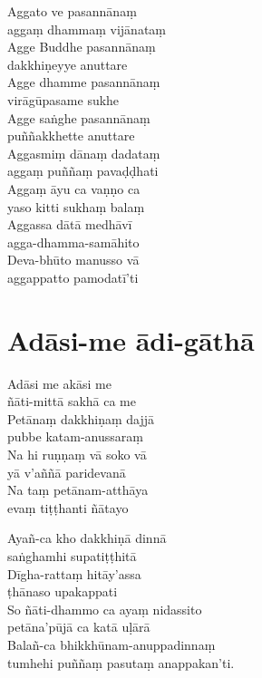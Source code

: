 
\begin{paritta}
  Aggato ve pasannānaṃ\\\vin aggaṃ dhammaṃ vijānataṃ\\
  Agge Buddhe pasannānaṃ\\\vin dakkhiṇeyye anuttare\\
  Agge dhamme pasannānaṃ\\\vin virāgūpasame sukhe\\
  Agge saṅghe pasannānaṃ\\\vin puññakkhette anuttare\\
  Aggasmiṃ dānaṃ dadataṃ\\\vin aggaṃ puññaṃ pavaḍḍhati\\
  Aggaṃ āyu ca vaṇṇo ca\\\vin yaso kitti sukhaṃ balaṃ\\
  Aggassa dātā medhāvī\\\vin agga-dhamma-samāhito\\
  Deva-bhūto manusso vā\\\vin aggappatto pamodatī'ti 
\end{paritta}

\section{Adāsi-me ādi-gāthā}



\enlargethispage{\baselineskip}

\begin{paritta}
Adāsi me akāsi me\\\vin ñāti-mittā sakhā ca me\\
Petānaṃ dakkhiṇaṃ dajjā\\\vin pubbe katam-anussaraṃ\\
Na hi ruṇṇaṃ vā soko vā\\\vin yā v'aññā paridevanā\\
Na taṃ petānam-atthāya\\\vin evaṃ tiṭṭhanti ñātayo


Ayañ-ca kho dakkhiṇā dinnā\\\vin saṅghamhi supatiṭṭhitā\\
Dīgha-rattaṃ hitāy'assa\\\vin ṭhānaso upakappati\\
So ñāti-dhammo ca ayaṃ nidassito\\\vin petāna'pūjā ca katā uḷārā\\
Balañ-ca bhikkhūnam-anuppadinnaṃ\\\vin tumhehi puññaṃ pasutaṃ anappakan'ti.
\end{paritta}

